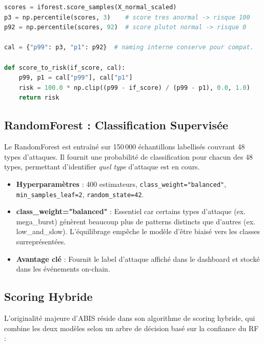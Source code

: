 \documentclass[12pt,a4paper]{report}
\newcommand{\code}[1]{\texttt{#1}}
\begin{document}
\begin{lstlisting}[language=Python, caption={Calibration de l'IsolationForest}, label={lst:if_calibration}]
scores = iforest.score_samples(X_normal_scaled)
p3 = np.percentile(scores, 3)    # score tres anormal -> risque 100
p92 = np.percentile(scores, 92)  # score plutot normal -> risque 0

cal = {"p99": p3, "p1": p92}  # naming interne conserve pour compat.

def score_to_risk(if_score, cal):
    p99, p1 = cal["p99"], cal["p1"]
    risk = 100.0 * np.clip((p99 - if_score) / (p99 - p1), 0.0, 1.0)
    return risk
\end{lstlisting}

\subsection{RandomForest : Classification Supervisée}

Le RandomForest est entraîné sur 150\,000 échantillons labellisés couvrant 48 types d'attaques. Il fournit une probabilité de classification pour chacun des 48 types, permettant d'identifier \textit{quel type} d'attaque est en cours.

\begin{itemize}
  \item \textbf{Hyperparamètres} : 400 estimateurs, \code{class\_weight="balanced"}, \code{min\_samples\_leaf=2}, \code{random\_state=42}.
  \item \textbf{class\_weight="balanced"} : Essentiel car certains types d'attaque (ex. mega\_burst) génèrent beaucoup plus de patterns distincts que d'autres (ex. low\_and\_slow). L'équilibrage empêche le modèle d'être biaisé vers les classes surreprésentées.
  \item \textbf{Avantage clé} : Fournit le label d'attaque affiché dans le dashboard et stocké dans les événements on-chain.
\end{itemize}

\subsection{Scoring Hybride}

L'originalité majeure d'ABIS réside dans son algorithme de scoring hybride, qui combine les deux modèles selon un arbre de décision basé sur la confiance du RF :
\end{document}
